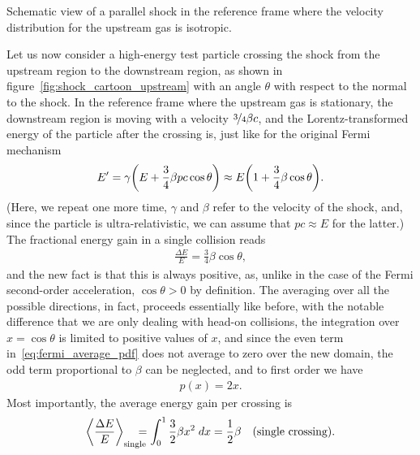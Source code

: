 \begin{marginfigure}
  
  \caption{Schematic view of a parallel shock in the reference frame where the
  velocity distribution for the upstream gas is isotropic.}
  \label{fig:shock_cartoon_upstream}
\end{marginfigure}

Let us now consider a high-energy test particle crossing the shock from the upstream
region to the downstream region, as shown in figure~\ref{fig:shock_cartoon_upstream}
with an angle $\theta$ with respect to the normal to the shock. In the reference
frame where the upstream gas is stationary, the downstream region is moving with
a velocity $\nicefrac{3}{4} \beta c$, and the Lorentz-transformed energy of the particle after
the crossing is, just like for the original Fermi mechanism
\begin{align*}
  E' = \gamma \qty(E + \frac{3}{4}\beta pc \cos\theta) \approx
  E \qty(1 + \frac{3}{4}\beta \cos\theta).
\end{align*}
(Here, we repeat one more time, $\gamma$ and $\beta$ refer to the velocity of the
shock, and, since the particle is ultra-relativistic, we can assume that $pc \approx E$
for the latter.) The fractional energy gain in a single collision reads
\begin{align*}
  \frac{\Delta E}{E} = \frac{3}{4} \beta \cos\theta,
\end{align*}
and the new fact is that this is always positive, as, unlike in the case of the
Fermi second-order acceleration, $\cos\theta > 0$ by definition. The averaging over
all the possible directions, in fact, proceeds essentially like before, with the
notable difference that we are only dealing with head-on collisions, the integration
over $x = \cos\theta$ is limited to positive values of $x$, and since the even term
in~\eqref{eq:fermi_average_pdf} does not average to zero over the new domain, the
odd term proportional to $\beta$ can be neglected, and to first order we
have
\begin{align*}
  p(x) = 2 x.
\end{align*}
Most importantly, the average energy gain per crossing is
\begin{align}
  \left<\frac{\Delta E}{E}\right>_\text{single} \!\!\!\!\!\! =
  \int_0^{1} \frac{3}{2} \beta x^2 \;d{x} =
  \frac{1}{2} \beta \quad\text{(single crossing)}.
\end{align}

